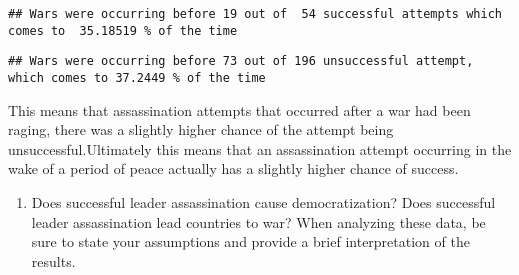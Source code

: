 \documentclass[
]{article}
\newenvironment{Shaded}{\begin{snugshade}}{\end{snugshade}}
\newcommand{\CharTok}[1]{\textcolor[rgb]{0.31,0.60,0.02}{#1}}
\newcommand{\DecValTok}[1]{\textcolor[rgb]{0.00,0.00,0.81}{#1}}
\newcommand{\KeywordTok}[1]{\textcolor[rgb]{0.13,0.29,0.53}{\textbf{#1}}}
\newcommand{\NormalTok}[1]{#1}
\newcommand{\OperatorTok}[1]{\textcolor[rgb]{0.81,0.36,0.00}{\textbf{#1}}}
\newcommand{\StringTok}[1]{\textcolor[rgb]{0.31,0.60,0.02}{#1}}
\providecommand{\tightlist}{%
  \setlength{\itemsep}{0pt}\setlength{\parskip}{0pt}}
\begin{document}
\begin{Shaded}
\end{Shaded}

\begin{verbatim}
## Wars were occurring before 19 out of  54 successful attempts which comes to  35.18519 % of the time
\end{verbatim}

\begin{Shaded}
\end{Shaded}

\begin{verbatim}
## Wars were occurring before 73 out of 196 unsuccessful attempt, which comes to 37.2449 % of the time
\end{verbatim}

This means that assassination attempts that occurred after a war had
been raging, there was a slightly higher chance of the attempt being
unsuccessful.Ultimately this means that an assassination attempt
occurring in the wake of a period of peace actually has a slightly
higher chance of success.

\begin{enumerate}
\def\labelenumi{\arabic{enumi}.}
\setcounter{enumi}{4}
\tightlist
\item
  Does successful leader assassination cause democratization? Does
  successful leader assassination lead countries to war? When analyzing
  these data, be sure to state your assumptions and provide a brief
  interpretation of the results.
\end{enumerate}
\end{document}
